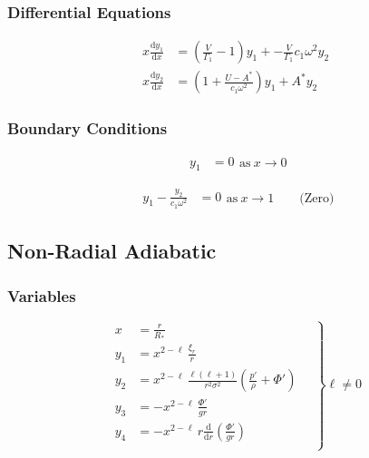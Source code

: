 \documentclass[fleqn]{article}
\newcommand{\diff}{\ensuremath{\mathrm{d}}}
\newcommand{\Vg}{\ensuremath{\frac{V}{\Gamma_{1}}}}
\newcommand{\As}{\ensuremath{A^{\ast}}}
\newcommand{\Rstar}{\ensuremath{R_{\ast}}}
\begin{document}
\subsubsection*{Differential Equations}

\begin{align*}
x \frac{\diff y_{1}}{\diff x} &=
\left(\Vg - 1 \right) y_{1} +
- \Vg c_{1} \omega^{2} y_{2} \\
x \frac{\diff y_{2}}{\diff x} &=
\left(1 + \frac{U - \As}{c_{1} \omega^{2}} \right) y_{1} +
\As y_{2}
\end{align*}

\subsubsection*{Boundary Conditions}

\begin{equation*}
\begin{aligned}
y_{1} &= 0
\end{aligned}
\text{as}\ x \rightarrow 0
\end{equation*}

\begin{equation*}
\begin{aligned}
y_{1} - \frac{y_{2}}{c_{1} \omega^{2}} &= 0
\end{aligned}
\text{as}\ x \rightarrow 1 \qquad \text{(Zero)}
\end{equation*}


\newpage

\subsection*{Non-Radial Adiabatic}

\subsubsection*{Variables}

\begin{equation*}
\left.
\begin{aligned}
x     &= \frac{r}{\Rstar} \\
y_{1} &= x^{2-\ell}\, \frac{\xi_{r}}{r} \\
y_{2} &= x^{2-\ell}\, \frac{\ell(\ell+1)}{r^{2} \sigma^{2}} \left( \frac{p'}{\rho} + \Phi' \right) \\
y_{3} &= - x^{2-\ell}\, \frac{\Phi'}{gr} \\
y_{4} &= - x^{2-\ell}\, r \frac{\diff}{\diff r} \left( \frac{\Phi'}{g r} \right) \\
\end{aligned}
\quad \right\} \ell \neq 0
\end{equation*}
\end{document}
